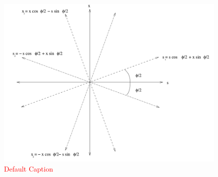 \begin{figure}
\begin{center}
\includegraphics[width=\linewidth,height=\textheight,keepaspectratio]{./figures/bunch_rotation}
\caption{ \textcolor{red}{Default Caption} }
\label{fig:bunch_rotation}
\end{center}
\end{figure}
